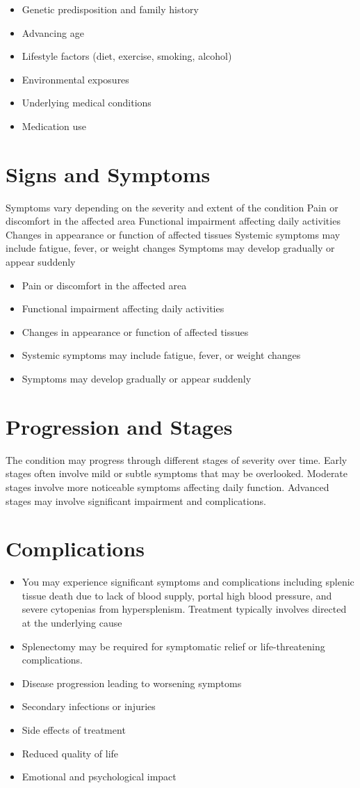\begin{itemize}[noitemsep]
  \item Genetic predisposition and family history
  \item Advancing age
  \item Lifestyle factors (diet, exercise, smoking, alcohol)
  \item Environmental exposures
  \item Underlying medical conditions
  \item Medication use
\end{itemize}
\section{Signs and Symptoms}
Symptoms vary depending on the severity and extent of the condition Pain or discomfort in the affected area Functional impairment affecting daily activities Changes in appearance or function of affected tissues Systemic symptoms may include fatigue, fever, or weight changes Symptoms may develop gradually or appear suddenly

\begin{itemize}[noitemsep]
  \item Pain or discomfort in the affected area
  \item Functional impairment affecting daily activities
  \item Changes in appearance or function of affected tissues
  \item Systemic symptoms may include fatigue, fever, or weight changes
  \item Symptoms may develop gradually or appear suddenly
\end{itemize}
\section{Progression and Stages}
The condition may progress through different stages of severity over time. Early stages often involve mild or subtle symptoms that may be overlooked. Moderate stages involve more noticeable symptoms affecting daily function. Advanced stages may involve significant impairment and complications.
\section{Complications}
\begin{itemize}[noitemsep]
  \item You may experience significant symptoms and complications including splenic tissue death due to lack of blood supply, portal high blood pressure, and severe cytopenias from hypersplenism. Treatment typically involves directed at the underlying cause
  \item Splenectomy may be required for symptomatic relief or life-threatening complications.
  \item Disease progression leading to worsening symptoms
  \item Secondary infections or injuries
  \item Side effects of treatment
  \item Reduced quality of life
  \item Emotional and psychological impact
\end{itemize}
